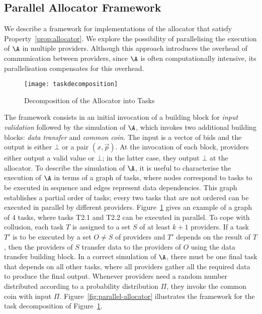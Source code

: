 \subsection{Parallel Allocator Framework}
\label{sec__distrib_auctioneer_protocol_implementation}

We describe a framework for implementations of
the allocator that satisfy Property~\ref{prop:allocator}.
We explore the possibility of parallelising the execution of $\A$ in multiple providers.
Although this approach introduces the overhead of communication between providers,
since $\A$ is often computationally intensive,
its parallelisation compensates for this overhead.

\begin{figure}[tbp]
	\centering
	\texttt{[image: taskdecomposition]}
	\caption{Decomposition of the Allocator into Tasks}
	\label{fig:taskdecomposition}
\end{figure}

The framework consists in an initial invocation of a 
building block for \emph{input validation} followed
by the simulation of $\A$, which invokes two additional building blocks:
\emph{data transfer} and \emph{common coin}.
The input is a vector of bids and the output is either $\bot$ or a pair $(x,\vec{p})$.
At the invocation of each block, providers either output a valid value
or $\bot$; in the latter case, they output $\bot$ at the allocator.
To describe the simulation of $\A$,
it is useful to characterise the execution of $\A$
in terms of a graph of tasks, where nodes correspond to
tasks to be executed in sequence and edges 
represent data dependencies. 
This graph establishes a partial order
of tasks; every two tasks that are not ordered can be executed in parallel
by different providers. Figure~\ref{fig:taskdecomposition}
gives an example of a graph of $4$ tasks,
where tasks T2.1 and T2.2 can be executed in parallel.
To cope with collusion, each task $T$ is assigned to a set $S$ of at least $k+1$ providers.
If a task $T'$ is to be executed by a set $O \neq S$ of providers and $T'$ depends on
the result of $T$, then the providers of $S$ transfer data to the providers of $O$
using the data transfer building block. In a correct simulation of $\A$,
there must be one final task that depends on all other tasks,
where all providers gather all the required data to produce the final output.
Whenever providers need a random number distributed according to a 
probability distribution $\Pi$, they invoke the common coin with input $\Pi$.
Figure~\ref{fig:parallel-allocator} illustrates the framework
for the task decomposition of Figure~\ref{fig:taskdecomposition}.

